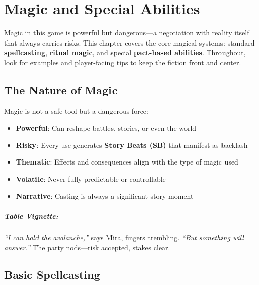 
\chapter{Magic and Special Abilities} \label{ch:magic}

\begin{multicols}{2}

Magic in this game is powerful but dangerous—a negotiation with reality itself that always carries risks. This chapter covers the core magical systems: standard \textbf{spellcasting}, \textbf{ritual magic}, and special \textbf{pact-based abilities}. Throughout, look for examples and player-facing tips to keep the fiction front and center.

\section{The Nature of Magic} 

Magic is not a safe tool but a dangerous force:
\begin{itemize}
\item \textbf{Powerful}: Can reshape battles, stories, or even the world
\item \textbf{Risky}: Every use generates \textbf{Story Beats (SB)} that manifest as backlash
\item \textbf{Thematic}: Effects and consequences align with the type of magic used
\item \textbf{Volatile}: Never fully predictable or controllable
\item \textbf{Narrative}: Casting is always a significant story moment
\end{itemize}

\paragraph{Table Vignette:}
\emph{“I can hold the avalanche,”} says Mira, fingers trembling. \emph{“But something will answer.”} The party nods—risk accepted, stakes clear.

\section{Basic Spellcasting} 


\end{multicols}
